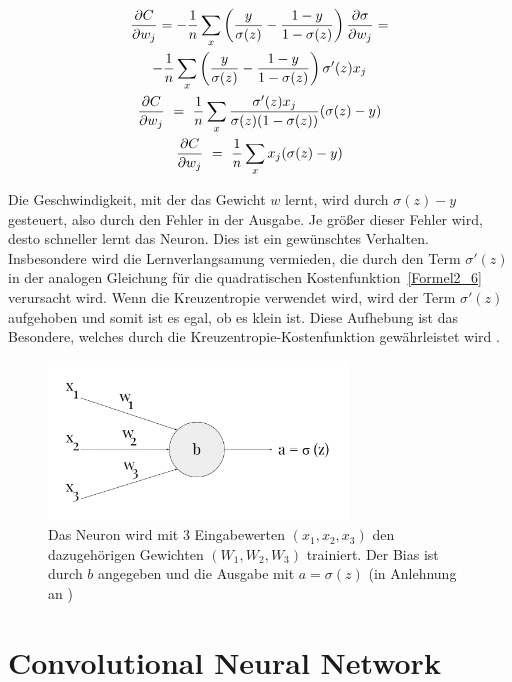     \begin{gather} \label{Formel2_9}
        \frac{\partial C}{\partial w_{j}} =-\frac{1}{n}\sum _{x}\left(\frac{y}{\sigma ( z)} -\frac{1-y}{1-\sigma ( z)}\right)\frac{\partial \sigma }{\partial w_{j}} = \notag\\
        -\frac{1}{n}\sum _{x}\left(\frac{y}{\sigma ( z)} -\frac{1-y}{1-\sigma ( z)}\right) \sigma '( z) x_{j}
        \notag\\
        \frac{\partial C}{\partial w_{j}} \ =\ \frac{1}{n}\sum _{x}\frac{\sigma '( z) x_{j}}{\sigma ( z)( 1-\sigma ( z))}( \sigma ( z) -y)
        \notag\\
        \frac{\partial C}{\partial w_{j}} \ =\ \frac{1}{n}\sum _{x} x_{j}( \sigma ( z) -y)
    \end{gather}

    Die Geschwindigkeit, mit der das Gewicht $w$ lernt, wird durch $\sigma(z) - y$ gesteuert, also durch den Fehler in der Ausgabe. Je größer dieser Fehler wird, desto schneller lernt das Neuron. Dies ist ein gewünschtes Verhalten. Insbesondere wird die Lernverlangsamung vermieden, die durch den Term $\sigma'(z)$ in der analogen Gleichung für die quadratischen Kostenfunktion~\ref{Formel2_6} verursacht wird. Wenn die Kreuzentropie verwendet wird, wird der Term $\sigma'(z)$ aufgehoben und somit ist es egal, ob es klein ist. Diese Aufhebung ist das Besondere, welches durch die Kreuzentropie-Kostenfunktion gewährleistet wird \cite[63-64]{Nielsen2015}.

    \begin{figure}[H]
        \centering
        \includegraphics[width=8cm]{kapitel2/entropie.png}
        \caption[Darstellung der Kreuzentropie am beispiel eines Neurons]{Das Neuron wird mit 3 Eingabewerten $(x_1, x_2, x_3)$ den dazugehörigen Gewichten $(W_1, W_2, W_3)$ trainiert. Der Bias ist durch $b$ angegeben und die Ausgabe mit $a = \sigma(z)$ (in Anlehnung an \cite*{Nielsen2015})}
        \label{Kap2:Entropie}
    \end{figure}

    \section{Convolutional Neural Network}

